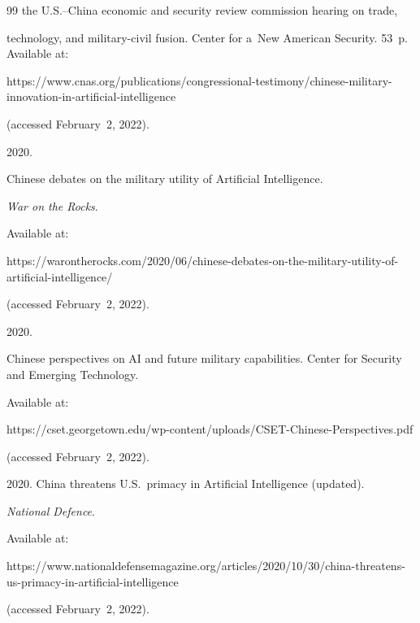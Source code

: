 {{\begin{thebibliography}{99}
the U.S.--China economic and security review commission hearing on trade, 


technology, and military-civil fusion. Center for a~New American Security. 53~p. Available at: 


{\sf https://www.cnas.org/publications/congressional-testimony/\linebreak chinese-military-innovation-in-artificial-intelligence}


 (accessed February~2, 2022).




 2020.


Chinese debates on the military utility of Artificial Intelligence.


\textit{War on the Rocks}.  


Available at: 


{\sf https://warontherocks.com/2020/06/chinese-debates-on-the-military-utility-of-artificial-intelligence/}


 (accessed February~2, 2022).


 




 2020.


Chinese perspectives on AI and future military capabilities. Center for Security and Emerging Technology. 


Available at: 


{\sf https://cset.georgetown.edu/wp-content/uploads/CSET-Chinese-Perspectives.pdf}


 (accessed February~2, 2022).


 




     2020. China threatens U.S.\ primacy in Artificial Intelligence (updated). 


    \textit{National Defence}.


 Available at: 


{\sf https://www.nationaldefensemagazine.org/\linebreak articles/2020/10/30/china-threatens-us-primacy-in-artificial-intelligence}


 (accessed February~2, 2022).











\end{thebibliography}}}
